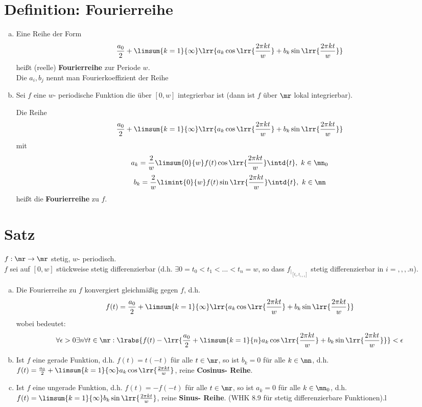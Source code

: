 \section{Definition: Fourierreihe}
	\begin{enumerate}[a)]
	\item Eine Reihe der Form
	\[\dfrac{a_0}{2}+\limsum{k=1}{\infty}\lrr{a_k\cos\lrr{\frac{2\pi kt}{w}}+b_k\sin\lrr{\dfrac{2\pi kt}{w}}}\]
	heißt (reelle) \textbf{Fourierreihe} zur Periode $ w $.\\
	Die $ a_i,b_j $ nennt man Fourierkoeffizient der Reihe
	\item Sei $ f $ eine $ w $- periodische Funktion die über $ [0,w] $ integrierbar ist (dann ist $ f $ über $ \mr $ lokal integrierbar).
	
	Die Reihe
	\[\dfrac{a_0}{2}+\limsum{k=1}{\infty}\lrr{a_k\cos\lrr{\frac{2\pi kt}{w}}+b_k\sin\lrr{\dfrac{2\pi kt}{w}}}\]
	mit
	\[a_k=\frac{2}{w}\limsum{0}{w}f(t)\cos\lrr{\dfrac{2\pi kt}{w}}\intd{t},\ k\in\mn_0\]
	\[b_k=\frac{2}{w}\limint{0}{w}f(t)\sin\lrr{\dfrac{2\pi kt}{w}}\intd{t},\ k\in\mn\]
	heißt die \textbf{Fourierreihe} zu $ f $.
	\end{enumerate}
	
\section{Satz}
	$ f:\mr\rightarrow\mr $ stetig, $ w $- periodisch.\\
	$ f $ sei auf $[0,w]$ stückweise stetig differenzierbar (d.h. $\exists 0=t_0<t_1<...<t_n=w$, so dass $f_{|_{[t_1,t_{i+1}]}}$ stetig differenzierbar in $i=,,,.n$).
	\begin{enumerate}[a)]
	\item Die Fourierreihe zu $f$ konvergiert gleichmäßig gegen $f$, d.h.
	\[f(t)=\dfrac{a_0}{2}+\limsum{k=1}{\infty}\lrr{a_k\cos\lrr{\dfrac{2\pi kt}{w}}+b_k\sin\lrr{\dfrac{2\pi kt}{w}}}\]
	wobei  bedeutet: \[\forall\epsilon>0\exists n\forall t\in\mr: \lrabs{f(t)-\lrr{\dfrac{a_0}{2}+\limsum{k=1}{n}a_k\cos\lrr{\dfrac{2\pi kt}{w}}+b_k\sin\lrr{\dfrac{2\pi kt}{w}}}}<\epsilon\]
	\item Ist $f$ eine gerade Funktion, d.h. $f(t)=t(-t)$ für alle $t\in\mr$, so ist $b_k=0$ für alle $k\in\mn$, d.h. $f(t)=\frac{a_0}{2}+\limsum{k=1}{\infty}a_k\cos\lrr{\frac{2\pi kt}{w}}$, reine \textbf{Cosinus- Reihe}.
	\item Ist $f$ eine ungerade Funktion, d.h. $f(t)=-f(-t)$ für alle $t\in\mr$, so ist $a_k=0$ für alle $k\in\mn_0$, d.h. $f(t)=\limsum{k=1}{\infty}b_k\sin\lrr{\frac{2\pi kt}{w}}$, reine \textbf{Sinus- Reihe}. (WHK 8.9 für stetig differenzierbare Funktionen).l
	\end{enumerate}
	
